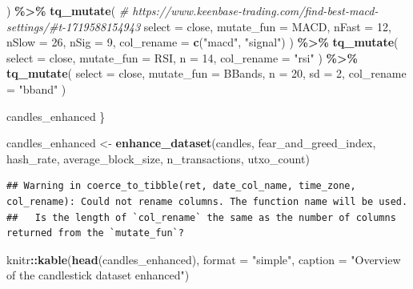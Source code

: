 \documentclass[
]{article}
\newenvironment{Shaded}{\begin{snugshade}}{\end{snugshade}}
\newcommand{\AttributeTok}[1]{\textcolor[rgb]{0.13,0.29,0.53}{#1}}
\newcommand{\CommentTok}[1]{\textcolor[rgb]{0.56,0.35,0.01}{\textit{#1}}}
\newcommand{\DecValTok}[1]{\textcolor[rgb]{0.00,0.00,0.81}{#1}}
\newcommand{\FunctionTok}[1]{\textcolor[rgb]{0.13,0.29,0.53}{\textbf{#1}}}
\newcommand{\NormalTok}[1]{#1}
\newcommand{\OtherTok}[1]{\textcolor[rgb]{0.56,0.35,0.01}{#1}}
\newcommand{\SpecialCharTok}[1]{\textcolor[rgb]{0.81,0.36,0.00}{\textbf{#1}}}
\newcommand{\StringTok}[1]{\textcolor[rgb]{0.31,0.60,0.02}{#1}}
\begin{document}
\begin{Shaded}
\begin{Highlighting}[]
\NormalTok{    ) }\SpecialCharTok{\%\textgreater{}\%}
    \FunctionTok{tq\_mutate}\NormalTok{( }\CommentTok{\# https://www.keenbase{-}trading.com/find{-}best{-}macd{-}settings/\#t{-}1719588154943}
      \AttributeTok{select =}\NormalTok{ close,}
      \AttributeTok{mutate\_fun =}\NormalTok{ MACD,}
      \AttributeTok{nFast =} \DecValTok{12}\NormalTok{,}
      \AttributeTok{nSlow =} \DecValTok{26}\NormalTok{,}
      \AttributeTok{nSig =} \DecValTok{9}\NormalTok{,}
      \AttributeTok{col\_rename =} \FunctionTok{c}\NormalTok{(}\StringTok{"macd"}\NormalTok{, }\StringTok{"signal"}\NormalTok{)}
\NormalTok{    ) }\SpecialCharTok{\%\textgreater{}\%}
    \FunctionTok{tq\_mutate}\NormalTok{(}
      \AttributeTok{select =}\NormalTok{ close,}
      \AttributeTok{mutate\_fun =}\NormalTok{ RSI,}
      \AttributeTok{n =} \DecValTok{14}\NormalTok{,}
      \AttributeTok{col\_rename =} \StringTok{"rsi"}
\NormalTok{    ) }\SpecialCharTok{\%\textgreater{}\%}
    \FunctionTok{tq\_mutate}\NormalTok{(}
      \AttributeTok{select =}\NormalTok{ close,}
      \AttributeTok{mutate\_fun =}\NormalTok{ BBands,}
      \AttributeTok{n =} \DecValTok{20}\NormalTok{,}
      \AttributeTok{sd =} \DecValTok{2}\NormalTok{,}
      \AttributeTok{col\_rename =} \StringTok{"bband"}
\NormalTok{    )}

\NormalTok{  candles\_enhanced}
\NormalTok{\}}

\NormalTok{candles\_enhanced }\OtherTok{\textless{}{-}} \FunctionTok{enhance\_dataset}\NormalTok{(candles, fear\_and\_greed\_index, hash\_rate, average\_block\_size, n\_transactions, utxo\_count)}
\end{Highlighting}
\end{Shaded}

\begin{verbatim}
## Warning in coerce_to_tibble(ret, date_col_name, time_zone, col_rename): Could not rename columns. The function name will be used. 
##   Is the length of `col_rename` the same as the number of columns returned from the `mutate_fun`?
\end{verbatim}

\begin{Shaded}
\begin{Highlighting}[]
\NormalTok{knitr}\SpecialCharTok{::}\FunctionTok{kable}\NormalTok{(}\FunctionTok{head}\NormalTok{(candles\_enhanced), }\AttributeTok{format =} \StringTok{"simple"}\NormalTok{, }\AttributeTok{caption =} \StringTok{"Overview of the candlestick dataset enhanced"}\NormalTok{)}
\end{Highlighting}
\end{Shaded}
\end{document}
